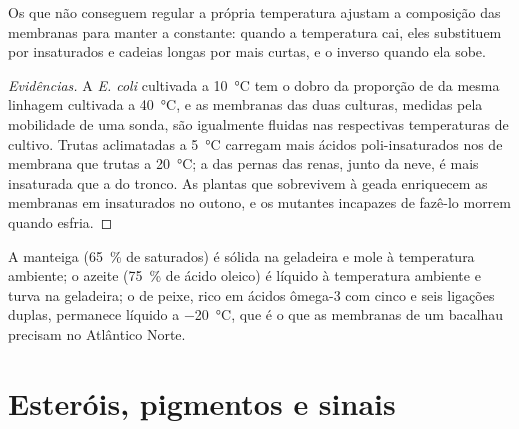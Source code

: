 \begin{proposition}\label{prop:b1:lipids:homeoviscous}
Os  que não conseguem regular a própria temperatura ajustam a
composição das membranas para manter a  constante: quando a
temperatura cai, eles substituem  por
insaturados e cadeias longas por mais curtas, e o inverso quando ela
sobe.
\end{proposition}
\begin{proof}[Evidências]
A \emph{E. coli} cultivada a \qty{10}{\celsius} tem o dobro da proporção
de  da mesma linhagem cultivada a
\qty{40}{\celsius}, e as membranas das duas culturas, medidas pela
mobilidade de uma sonda, são igualmente fluidas nas respectivas
temperaturas de cultivo. Trutas aclimatadas a \qty{5}{\celsius} carregam
mais ácidos poli-insaturados nos  de membrana que trutas a
\qty{20}{\celsius}; a  das pernas das renas, junto da neve, é
mais insaturada que a  do tronco. As plantas que sobrevivem à
geada enriquecem as membranas em  insaturados no outono, e os
mutantes incapazes de fazê-lo morrem quando esfria.
\end{proof}

\begin{example}\label{ex:b1:lipids:kitchen}
A manteiga (\qty{65}{\%} de saturados) é sólida na geladeira e mole à
temperatura ambiente; o azeite (\qty{75}{\%} de ácido oleico) é líquido
à temperatura ambiente e turva na geladeira; o  de peixe, rico em
ácidos ômega-3 com cinco e seis ligações duplas, permanece líquido a
\qty{-20}{\celsius}, que é o que as membranas de um bacalhau precisam no
Atlântico Norte.
\end{example}

\section{Esteróis, pigmentos e sinais}

